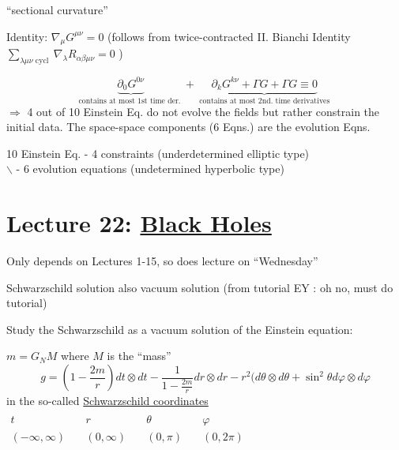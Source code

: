 \documentclass[10pt, twoside]{amsart}
\begin{document}
\begin{multicols*}{2}
``sectional curvature''

Identity: $\nabla_{\mu} G^{\mu \nu} =0$ (follows from twice-contracted II. Bianchi Identity \\
 $\sum_{\lambda \mu \nu \text{ cycl } } \nabla_{\lambda} R_{\alpha \beta \mu \nu } = 0 $ )

\[
\underbrace{ \partial_0 G^{0\nu} }_{\text{contains at most 1st time der. }} + \underbrace{ \partial_k G^{k\nu} + \Gamma G  + \Gamma G \equiv0 }_{\text{ contains at most 2nd. time derivatives }}
\]
$\Longrightarrow$ 4 out of 10 Einstein Eq. do not evolve the fields but rather constrain the initial data. The space-space components (6 Eqns.) are the evolution Eqns.  

10 Einstein Eq. - 4 constraints (underdetermined elliptic type) \\
\phantom{10 Einstein Eq.\quad \, } $\backslash$ - 6 evolution equations (undetermined hyperbolic type)

\section{}

\section{}

\section{}

\section{Lecture 22: \underline{Black Holes}}

Only depends on Lectures 1-15, so does lecture on ``Wednesday''

Schwarzschild solution also vacuum solution (from tutorial EY : oh no, must do tutorial)

Study the Schwarzschild as a vacuum solution of the Einstein equation:

$m = G_N M$ where $M$ is the ``mass''
\[
g = \left( 1 - \frac{2m}{r} \right) dt \otimes dt - \frac{1}{ 1 - \frac{2m}{r} } dr \otimes dr - r^2 ( d\theta \otimes d\theta + \sin^2{\theta} d\varphi \otimes d\varphi
\]
in the so-called \underline{Schwarzschild coordinates}  $\begin{aligned} & & & & \quad \\
 t \quad & r \quad & \theta \quad & \varphi \\ 
 (-\infty,\infty) \quad & (0,\infty) \quad & (0,\pi) \quad & (0,2\pi) \end{aligned}$


\end{multicols*}
\end{document}
